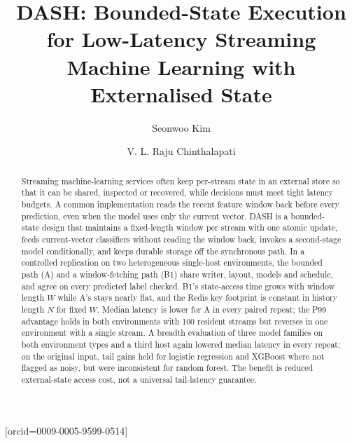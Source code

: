 \documentclass[a4paper,fleqn]{cas-dc}
\begin{document}
\let\WriteBookmarks\relax
\def\floatpagepagefraction{1}
\def\textpagefraction{.001}


\title [mode = title]{DASH: Bounded-State Execution for Low-Latency Streaming Machine Learning with Externalised State}

\author[1]{Seonwoo Kim}[orcid=0009-0005-9599-0514]

\author[1]{V. L. Raju Chinthalapati}
\cormark[1]



\begin{abstract}
Streaming machine-learning services often keep per-stream state in an external store so that it can be shared, inspected or recovered, while decisions must meet tight latency budgets. A common implementation reads the recent feature window back before every prediction, even when the model uses only the current vector. DASH is a bounded-state design that maintains a fixed-length window per stream with one atomic update, feeds current-vector classifiers without reading the window back, invokes a second-stage model conditionally, and keeps durable storage off the synchronous path. In a controlled replication on two heterogeneous single-host environments, the bounded path (A) and a window-fetching path (B1) share writer, layout, models and schedule, and agree on every predicted label checked. B1's state-access time grows with window length $W$ while A's stays nearly flat, and the Redis key footprint is constant in history length $N$ for fixed $W$. Median latency is lower for A in every paired repeat; the P99 advantage holds in both environments with 100 resident streams but reverses in one environment with a single stream. A breadth evaluation of three model families on both environment types and a third host again lowered median latency in every repeat; on the original input, tail gains held for logistic regression and XGBoost where not flagged as noisy, but were inconsistent for random forest. The benefit is reduced external-state access cost, not a universal tail-latency guarantee.
\end{abstract}
\end{document}
